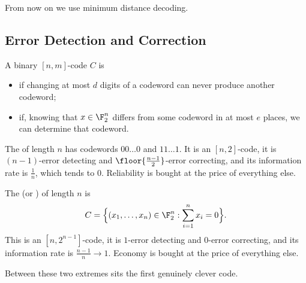 From now on we use minimum distance decoding.

\subsection{Error Detection and Correction}

\begin{definition}
	A binary $[n,m]$-code $C$ is
	\begin{itemize}
		\item {} if changing at most $d$ digits of a codeword can never produce another codeword;
		\item {} if, knowing that $x \in \F_2^n$ differs from some codeword in at most $e$ places, we can determine that codeword.
	\end{itemize}
\end{definition}

\begin{example}
	The  of length $n$ has codewords $00\dots0$ and $11\dots1$. It is an $[n,2]$-code, it is $(n-1)$-error detecting and $\floor{\frac{n-1}{2}}$-error correcting, and its information rate is $\frac1n$, which tends to $0$. Reliability is bought at the price of everything else.
\end{example}

\begin{example}
	The  (or ) of length $n$ is
	$$C = \Bigl\{(x_1, \dots, x_n) \in \F_2^n : \sum_{i=1}^n x_i = 0\Bigr\}.$$
	This is an $[n, 2^{n-1}]$-code, it is $1$-error detecting and $0$-error correcting, and its information rate is $\frac{n-1}{n} \to 1$. Economy is bought at the price of everything else.
\end{example}

Between these two extremes sits the first genuinely clever code.

